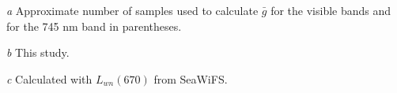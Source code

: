 \documentclass[preview]{standalone}
\begin{document}
\begin{threeparttable}
\begin{tabular}{cccccccccc}
\hline 
\end{tabular}
\begin{tablenotes}
\item [\it a] Approximate number of samples used to calculate $\bar{g}$ for the visible bands and for the 745 nm band in parentheses.
\item [\it b] This study.
\item [\it c] Calculated with $L_{wn}(670)$ from SeaWiFS.
\end{tablenotes}
\end{threeparttable}
\end{document}
